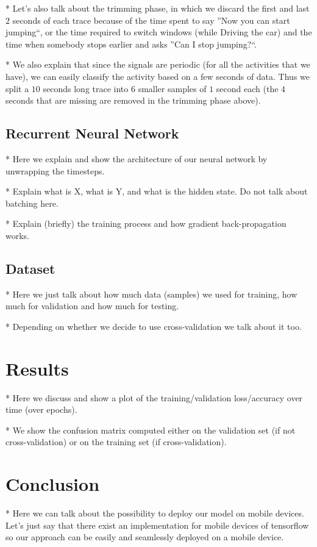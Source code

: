 \documentclass{article}
\begin{document}
* Let's also talk about the trimming phase, in which we discard the first and last $2$ seconds
of each trace because of the time spent to say ''Now you can start jumping``, or the time
required to switch windows (while Driving the car) and the time when somebody stops earlier and
asks ''Can I stop jumping?``.

* We also explain that since the signals are periodic (for all the activities that we have), we can 
easily classify the activity based on a few seconds of data. Thus we split a $10$ seconds long
trace into $6$ smaller samples of $1$ second each (the $4$ seconds that are missing are removed
in the trimming phase above).


\subsection{Recurrent Neural Network}
\vspace{-.3cm}
* Here we explain and show the architecture of our neural network by unwrapping the timesteps.

* Explain what is X, what is Y, and what is the hidden state. Do not talk about batching here.

* Explain (briefly) the training process and how gradient back-propagation works.


\subsection{Dataset}
\vspace{-.3cm} 
* Here we just talk about how much data (samples) we used for training, how much for validation
and how much for testing.

* Depending on whether we decide to use cross-validation we talk about it too.


\section{Results}
\vspace{-.3cm}
* Here we discuss and show a plot of the training/validation loss/accuracy over time (over epochs).

* We show the confusion matrix computed either on the validation set (if not cross-validation) or
on the training set (if cross-validation).


\section{Conclusion}
\vspace{-.3cm}
* Here we can talk about the possibility to deploy our model on mobile devices. Let's just say that 
there exist an implementation for mobile devices of tensorflow so our approach can be easily and 
seamlessly deployed on a mobile device.
\end{document}
